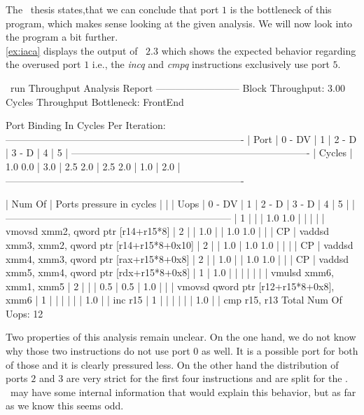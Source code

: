 The \osaca\ thesis states,that we can conclude that port $1$ is the bottleneck of this program, which makes sense looking at the given analysis. We will now look into the program a bit further.\\
\autoref{ex:iaca} displays the output of \iaca\ $2.3$ which shows the expected behavior regarding the overused port $1$ i.e., the \emph{incq} and \emph{cmpq} instructions exclusively use port $5$.

\begin{LabeledExample}{\iaca\ run}{\label{ex:iaca}}
  Throughput Analysis Report
  --------------------------
  Block Throughput: 3.00 Cycles       Throughput Bottleneck: FrontEnd
  
  Port Binding In Cycles Per Iteration:
  -------------------------------------------------------------------------
  |  Port  |  0   -  DV  |  1   |  2   -  D   |  3   -  D   |  4   |  5   |
  -------------------------------------------------------------------------
  | Cycles | 1.0    0.0  | 3.0  | 2.5    2.0  | 2.5    2.0  | 1.0  | 2.0  |
  -------------------------------------------------------------------------
  
      
  | Num Of |              Ports pressure in cycles               |    |
  |  Uops  |  0  - DV  |  1  |  2  -  D  |  3  -  D  |  4  |  5  |    |
  ---------------------------------------------------------------------
  |   1    |           |     | 1.0   1.0 |           |     |     |    | vmovsd xmm2, qword ptr [r14+r15*8]
  |   2    |           | 1.0 |           | 1.0   1.0 |     |     | CP | vaddsd xmm3, xmm2, qword ptr [r14+r15*8+0x10]
  |   2    |           | 1.0 | 1.0   1.0 |           |     |     | CP | vaddsd xmm4, xmm3, qword ptr [rax+r15*8+0x8]
  |   2    |           | 1.0 |           | 1.0   1.0 |     |     | CP | vaddsd xmm5, xmm4, qword ptr [rdx+r15*8+0x8]
  |   1    | 1.0       |     |           |           |     |     |    | vmulsd xmm6, xmm1, xmm5
  |   2    |           |     | 0.5       | 0.5       | 1.0 |     |    | vmovsd qword ptr [r12+r15*8+0x8], xmm6
  |   1    |           |     |           |           |     | 1.0 |    | inc r15
  |   1    |           |     |           |           |     | 1.0 |    | cmp r15, r13
  Total Num Of Uops: 12
\end{LabeledExample}

Two properties of this analysis remain unclear. On the one hand, we do not know why those two instructions do not use port $0$ as well. It is a possible port for both of those and it is clearly pressured less. On the other hand the distribution of ports $2$ and $3$ are very strict for the first four instructions and are split for the . \iaca\ may have some internal information that would explain this behavior, but as far as we know this seems odd.\\


